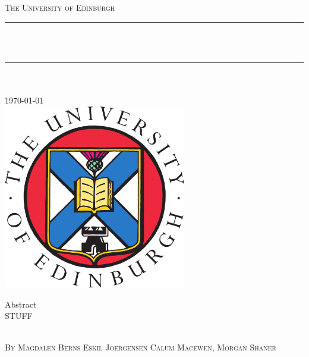 \documentclass[12pt, a4paper, oneside]{Thesis}
\title{\ttitle}
\let\oldincludegraphics\includegraphics
\renewcommand{\includegraphics}[2][]{
  \oldincludegraphics[width=8cm]{#2}}
\begin{document}
\frontmatter %
\fancyhead{} %
\rhead{\thepage} %
\lhead{} %
\pagestyle{fancy}
\newcommand{\HRule}{\rule{\linewidth}{0.5mm}} %




\begin{titlepage}
\begin{center}

\textsc{\LARGE The University of Edinburgh}\\[1.5cm]
\HRule \\[0.8cm] %

\textsc{\huge \bfseries \ttitle }\\[0.2cm]
\HRule \\[0.5cm] %
\textsc{\Large \deptname}\\[1.0cm]

\large \today \\[1cm]

\includegraphics[width=2.0cm]{logo}\\[1cm]


\begin{minipage}{0.2\textwidth}

\Large Abstract \\
STUFF

\end{minipage}\\[0.5cm]

\textsc{\large By Magdalen Berns Eskil Joergensen Calum Macewen, Morgan Shaner}

\end{center}

\end{titlepage}


\end{document}
